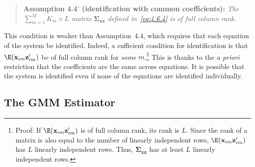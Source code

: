 \begin{quote}
\textbf{Assumption 4.4$'$ (identification with common coefficients):}\quad
\textit{The $\sum_{m=1}^{M} K_m \times L$ matrix $\boldsymbol{\Sigma}_{\mathbf{xz}}$
defined in~\eqref{eq:4.6.4} is of full column rank.}
\end{quote}

This condition is weaker than Assumption~4.4, which requires that each equation
of the system be identified. Indeed, a sufficient condition for identification is that
$\E(\mathbf{x}_{im} \mathbf{z}_{im}')$ be of full column rank for \textit{some}
$m$.\footnote{Proof: If $\E(\mathbf{x}_{im} \mathbf{z}_{im}')$ is of full column rank,
its rank is $L$. Since the rank of a matrix is also equal to the number of linearly
independent rows, $\E(\mathbf{x}_{im} \mathbf{z}_{im}')$ has $L$ linearly independent
rows. Thus, $\boldsymbol{\Sigma}_{\mathbf{xz}}$ has at least $L$ linearly independent rows.}
This is thanks to the \textit{a priori} restriction that the coefficients are the same
across equations. It is possible that the system is identified even if none of the
equations are identified individually.

\subsection*{The GMM Estimator}

